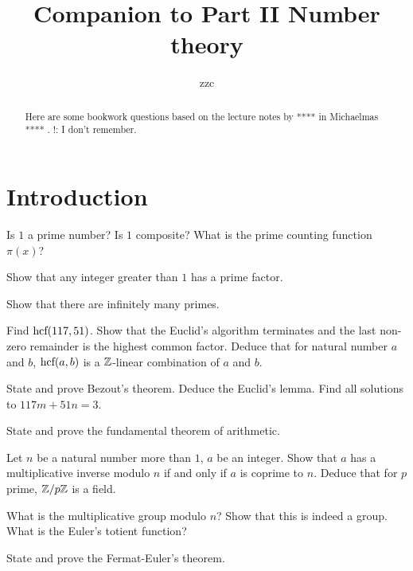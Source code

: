 


\title{Companion to Part II Number theory}
\author{zzc}
\maketitle

\rhead{\today}

\begin{abstract}
    Here are some bookwork questions based on the lecture notes by **** in Michaelmas ****
    . !: I don't remember.
\end{abstract}
\tableofcontents


\section{Introduction}
\begin{question}{1}
  Is $1$ a prime number? Is $1$ composite? What is the prime counting function $\pi(x)$?

  Show that any integer greater than $1$ has a prime factor.

  Show that there are infinitely many primes.

  Find $\text{hcf}(117,51)$. Show that the Euclid's algorithm terminates and the last non-zero remainder is the highest common factor. Deduce that for natural number $a$ and $b$, $\text{hcf}(a,b)$ is a $\mathbb{Z}$-linear combination of $a$ and $b$.

  State and prove Bezout's theorem. Deduce the Euclid's lemma. Find all solutions to $117 m + 51 n = 3$.

  State and prove the fundamental theorem of arithmetic.
\end{question}

\begin{question}{2}
    Let $n$ be a natural number more than $1$, $a$ be an integer. Show that $a$ has a multiplicative inverse modulo $n$ if and only if $a$ is coprime to $n$. Deduce that for $p$ prime, $\mathbb{Z} / p\mathbb{Z}$ is a field.

    What is the multiplicative group modulo $n$? Show that this is indeed a group. What is the Euler's totient function?

    State and prove the Fermat-Euler's theorem.
\end{question}

